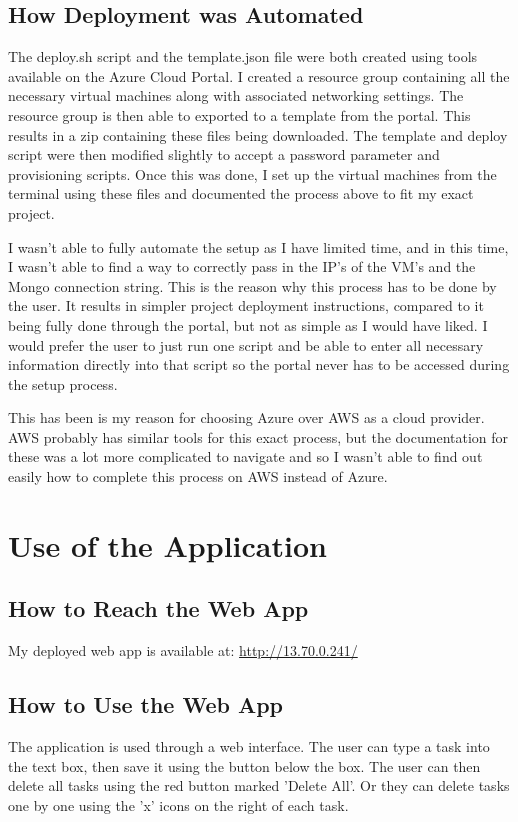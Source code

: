 \documentclass[12pt]{extarticle}
\begin{document}
\subsection{How Deployment was Automated}
The deploy.sh script and the template.json file were both created using tools available on the Azure Cloud Portal. I created a resource group containing all the necessary virtual machines along with associated networking settings. The resource group is then able to exported to a template from the portal. This results in a zip containing these files being downloaded. The template and deploy script were then modified slightly to accept a password parameter and provisioning scripts. Once this was done, I set up the virtual machines from the terminal using these files and documented the process above to fit my exact project. 

I wasn't able to fully automate the setup as I have limited time, and in this time, I wasn't able to find a way to correctly pass in the IP's of the VM's and the Mongo connection string. This is the reason why this process has to be done by the user. It results in simpler project deployment instructions, compared to it being fully done through the portal, but not as simple as I would have liked. I would prefer the user to just run one script and be able to enter all necessary information directly into that script so the portal never has to be accessed during the setup process.

This has been is my reason for choosing Azure over AWS as a cloud provider. AWS probably has similar tools for this exact process, but the documentation for these was a lot more complicated to navigate and so I wasn't able to find out easily how to complete this process on AWS instead of Azure.


\section{Use of the Application}
\subsection{How to Reach the Web App}
My deployed web app is available at: \url{http://13.70.0.241/}

\subsection{How to Use the Web App}
The application is used through a web interface. The user can type a task into the text box, then save it using the button below the box. The user can then delete all tasks using the red button marked 'Delete All'. Or they can delete tasks one by one using the 'x' icons on the right of each task.
\end{document}
